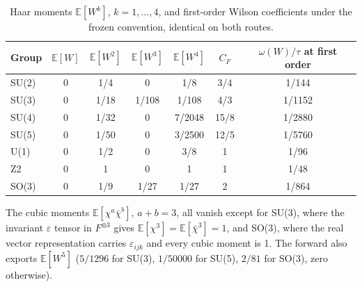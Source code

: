 \begin{table}[htbp]
\centering\small
\caption{Haar moments $\mathbb E[W^k]$, $k=1,\ldots,4$, and first-order Wilson
coefficients under the frozen convention, identical on both routes.}
\label{tab:bd1-moments}
\begin{tabular}{lcccccc}
\toprule
Group & $\mathbb E[W]$ & $\mathbb E[W^2]$ & $\mathbb E[W^3]$ & $\mathbb E[W^4]$ & $C_F$ & $\omega(W)/\tau$ at first order\\
\midrule
SU(2) & 0 & 1/4 & 0 & 1/8 & 3/4 & 1/144\\
SU(3) & 0 & 1/18 & 1/108 & 1/108 & 4/3 & 1/1152\\
SU(4) & 0 & 1/32 & 0 & 7/2048 & 15/8 & 1/2880\\
SU(5) & 0 & 1/50 & 0 & 3/2500 & 12/5 & 1/5760\\
U(1) & 0 & 1/2 & 0 & 3/8 & 1 & 1/96\\
Z2 & 0 & 1 & 0 & 1 & 1 & 1/48\\
SO(3) & 0 & 1/9 & 1/27 & 1/27 & 2 & 1/864\\
\bottomrule
\end{tabular}
\end{table}

The cubic moments $\mathbb E[\chi^a\bar\chi^b]$, $a+b=3$, all vanish except for
SU(3), where the invariant $\varepsilon$ tensor in $F^{\otimes3}$ gives
$\mathbb E[\chi^3]=\mathbb E[\bar\chi^3]=1$, and SO(3), where the real vector
representation carries $\varepsilon_{ijk}$ and every cubic moment is 1. The
forward also exports $\mathbb E[W^5]$ ($5/1296$ for SU(3), $1/50000$ for SU(5),
$2/81$ for SO(3), zero otherwise).

